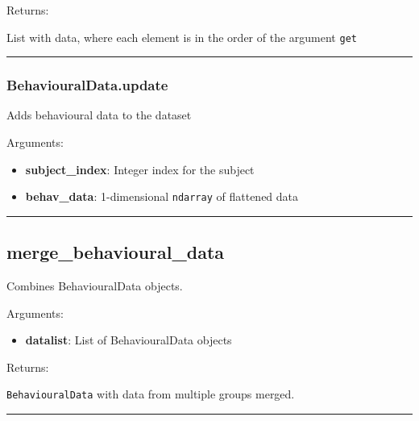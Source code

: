 Returns:

List with data, where each element is in the order of the argument
\texttt{get}

\begin{center}\rule{0.5\linewidth}{\linethickness}\end{center}

\hypertarget{behaviouraldata.update}{%
\subsubsection{BehaviouralData.update}\label{behaviouraldata.update}}

\begin{Shaded}
\begin{Highlighting}[]
\end{Highlighting}
\end{Shaded}

Adds behavioural data to the dataset

Arguments:

\begin{itemize}
\tightlist
\item
  \textbf{subject\_index}: Integer index for the subject
\item
  \textbf{behav\_data}: 1-dimensional \texttt{ndarray} of flattened data
\end{itemize}

\begin{center}\rule{0.5\linewidth}{\linethickness}\end{center}

\hypertarget{merge_behavioural_data}{%
\subsection{merge\_behavioural\_data}\label{merge_behavioural_data}}

\begin{Shaded}
\begin{Highlighting}[]
\end{Highlighting}
\end{Shaded}

Combines BehaviouralData objects.

Arguments:

\begin{itemize}
\tightlist
\item
  \textbf{datalist}: List of BehaviouralData objects
\end{itemize}

Returns:

\texttt{BehaviouralData} with data from multiple groups merged.

\begin{center}\rule{0.5\linewidth}{\linethickness}\end{center}
